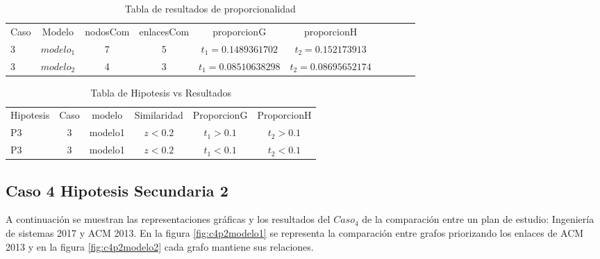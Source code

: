 \begin{table}[H]
\centering
\caption{Tabla de resultados de proporcionalidad}
\begin{tabular}[t]{lccccccccc}
\hline
Caso & Modelo & nodosCom & enlacesCom & proporcionG &proporcionH \\
3 & $modelo_1$ & 7 & 5 & $t_1=0.1489361702$ & $t_2=0.152173913$\\
3 & $modelo_2$ & 4 & 3 & $t_1=0.08510638298$ & $t_2=0.08695652174$\\
\hline
\end{tabular}
\label{tab:tabresultados2_C_3_P3}
\end{table}

\begin{table}[H]
\centering
\caption{Tabla de Hipotesis vs Resultados }
\begin{tabular}[t]{lccccc}
\hline
Hipotesis & Caso & modelo & Similaridad & ProporcionG & ProporcionH\\
P3 & 3 & modelo1 &$z<0.2$&$t_1>0.1$&$t_2>0.1$\\
P3 & 3 & modelo1 &$z<0.2$&$t_1<0.1$&$t_2<0.1$\\
\hline
\end{tabular}
\label{tab:hipotesis_C_3_P3}
\end{table}


\clearpage

\subsection{Caso 4 Hipotesis Secundaria 2}

A continuación se muestran las representaciones gráficas y los resultados del $Caso_4$ de la comparación entre un plan de estudio: Ingeniería de sistemas 2017 y ACM 2013. En la figura \ref{fig:c4p2modelo1} se representa la comparación entre grafos priorizando los enlaces de ACM 2013 y en la figura \ref{fig:c4p2modelo2} cada grafo mantiene sus relaciones. 

